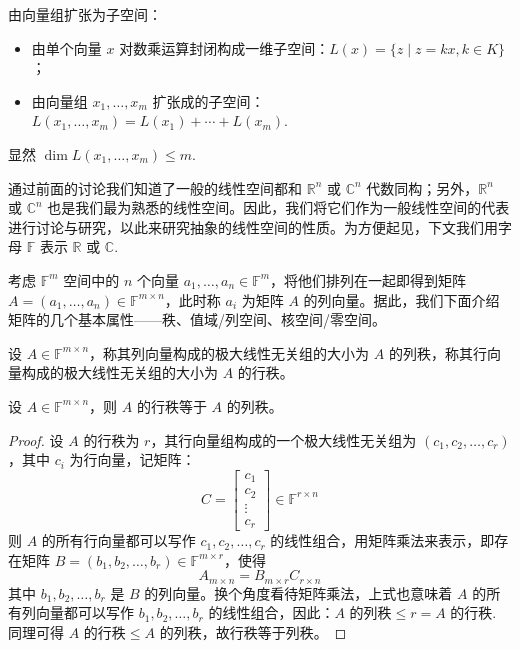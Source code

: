 \begin{definition}
由向量组扩张为子空间：
\begin{itemize}
    \item 由单个向量 $x$ 对数乘运算封闭构成一维子空间：$L(x)=\{z\mid z=kx,k\in K\}$；
    \item 由向量组 $x_1,\ldots,x_m$ 扩张成的子空间：$L(x_1,\ldots,x_m)=L(x_1)+\cdots+L(x_m)$.
\end{itemize}
显然 $\dim L(x_1,\ldots,x_m)\leq m$.    
\end{definition}

通过前面的讨论我们知道了一般的线性空间都和 $\mathbb R^n$ 或 $\mathbb C^n$ 代数同构；另外，$\mathbb R^n$ 或 $\mathbb C^n$ 也是我们最为熟悉的线性空间。因此，我们将它们作为一般线性空间的代表进行讨论与研究，以此来研究抽象的线性空间的性质。为方便起见，下文我们用字母 $\mathbb F$ 表示 $\mathbb R$ 或 $\mathbb C$.

考虑 $\mathbb F^m$ 空间中的 $n$ 个向量 $a_1,\ldots,a_n\in\mathbb F^m$，将他们排列在一起即得到矩阵 $A=(a_1,\ldots,a_n)\in\mathbb F^{m\times n}$，此时称 $a_i$ 为矩阵 $A$ 的列向量。据此，我们下面介绍矩阵的几个基本属性——秩、值域/列空间、核空间/零空间。

\begin{definition}[列秩，行秩]
设 $A\in\mathbb F^{m\times n}$，称其列向量构成的极大线性无关组的大小为 $A$ 的列秩，称其行向量构成的极大线性无关组的大小为 $A$ 的行秩。
\end{definition}

\begin{theorem}[行秩等于列秩]
设 $A\in\mathbb F^{m\times n}$，则 $A$ 的行秩等于 $A$ 的列秩。
\end{theorem}
\begin{proof}
设 $A$ 的行秩为 $r$，其行向量组构成的一个极大线性无关组为 $(c_1,c_2,\ldots,c_r)$，其中 $c_i$ 为行向量，记矩阵：
\[
    C=\begin{bmatrix}c_1\\c_2\\\vdots\\c_r\end{bmatrix}\in\mathbb F^{r\times n}
\]
则 $A$ 的所有行向量都可以写作 $c_1,c_2,\ldots,c_r$ 的线性组合，用矩阵乘法来表示，即存在矩阵 $B=(b_1,b_2,\ldots,b_r)\in\mathbb F^{m\times r}$，使得
\[
    A_{m\times n}=B_{m\times r}C_{r\times n}
\]
其中 $b_1,b_2,\ldots,b_r$ 是 $B$ 的列向量。换个角度看待矩阵乘法，上式也意味着 $A$ 的所有列向量都可以写作 $b_1,b_2,\ldots,b_r$ 的线性组合，因此：$A \text{ 的列秩} \leq r=A \text{ 的行秩}$. 同理可得 $A \text{ 的行秩}\leq A \text{ 的列秩}$，故行秩等于列秩。
\end{proof}

